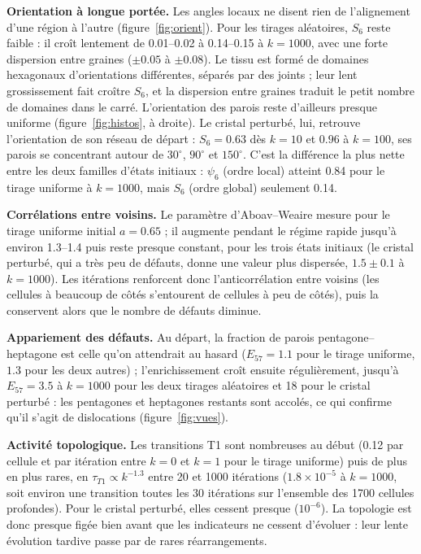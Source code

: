 \documentclass[10pt,a4paper]{article}
\begin{document}
\textbf{Orientation à longue portée.} Les angles locaux ne disent rien de l'alignement d'une région à l'autre
(figure~\ref{fig:orient}). Pour
les tirages aléatoires, $S_6$ reste faible : il croît lentement de 0.01--0.02 à 0.14--0.15 à $k=1000$, avec une
forte dispersion entre graines ($\pm0.05$ à $\pm0.08$). Le tissu est formé de domaines hexagonaux d'orientations
différentes, séparés par des joints ; leur lent grossissement fait croître $S_6$, et la dispersion entre graines
traduit le petit nombre de domaines dans le carré. L'orientation des parois reste d'ailleurs presque uniforme
(figure~\ref{fig:histos}, à droite). Le cristal perturbé, lui, retrouve l'orientation de son réseau de départ :
$S_6=0.63$ dès $k=10$ et $0.96$ à $k=100$, ses parois se concentrant autour de $30^\circ$, $90^\circ$ et
$150^\circ$. C'est la différence la plus nette entre les deux familles d'états initiaux : $\psi_6$ (ordre local)
atteint 0.84 pour le tirage uniforme à $k=1000$, mais $S_6$ (ordre global) seulement 0.14.

\textbf{Corrélations entre voisins.} Le paramètre d'Aboav--Weaire mesure pour le tirage uniforme initial
$a=0.65$ ; il augmente pendant le régime rapide jusqu'à environ 1.3--1.4 puis reste presque constant, pour les trois
états initiaux (le cristal perturbé, qui a très peu de défauts, donne une valeur plus dispersée, $1.5\pm0.1$ à
$k=1000$). Les itérations renforcent donc l'anticorrélation entre voisins (les cellules à beaucoup de côtés
s'entourent de cellules à peu de côtés), puis la conservent alors que le nombre de défauts diminue.

\textbf{Appariement des défauts.} Au départ, la fraction de parois pentagone--heptagone est celle qu'on attendrait
au hasard ($E_{57}=1.1$ pour le tirage uniforme, $1.3$ pour les deux autres) ; l'enrichissement croît ensuite
régulièrement, jusqu'à $E_{57}=3.5$ à $k=1000$ pour les deux tirages aléatoires et 18 pour le cristal perturbé :
les pentagones et heptagones restants sont accolés, ce qui confirme qu'il s'agit de dislocations
(figure~\ref{fig:vues}).

\textbf{Activité topologique.} Les transitions T1 sont nombreuses au début (0.12 par cellule et par itération entre
$k=0$ et $k=1$ pour le tirage uniforme) puis de plus en plus rares, en $\tau_{T1}\propto k^{-1.3}$ entre 20 et
1000 itérations ($1.8\times10^{-5}$ à $k=1000$, soit environ une transition toutes les 30 itérations sur
l'ensemble des 1700 cellules profondes). Pour le cristal perturbé, elles cessent presque ($10^{-6}$). La topologie est donc presque figée bien
avant que les indicateurs ne cessent d'évoluer : leur lente évolution tardive passe par de rares réarrangements.
\end{document}
